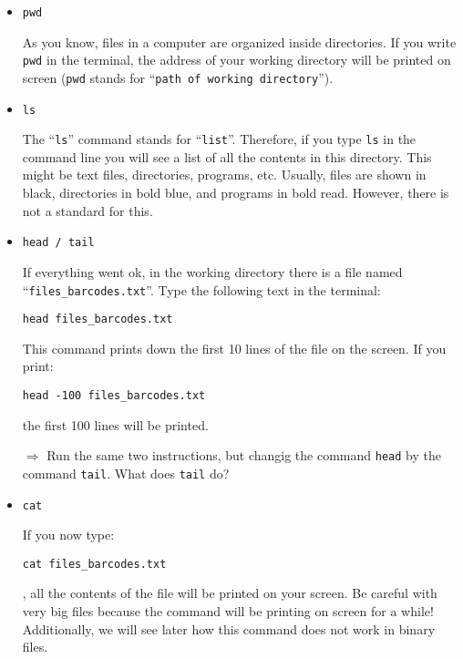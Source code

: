 \documentclass[11pt]{article}
\begin{document}
\begin{itemize}
\item \texttt{pwd}

As you know, files in a computer are organized inside directories. If you write \texttt{pwd} in the terminal, the address of your working directory will be printed on screen (\texttt{pwd} stands for ``\texttt{path of working directory}'').

\item \texttt{ls}

The ``\texttt{ls}'' command stands for ``\texttt{list}''. Therefore, if you type \texttt{ls} in the command line you will see a list of all the contents in this directory. This might be text files, directories, programs, etc. Usually, files are shown in black, directories in bold blue, and programs in bold read. However, there is not a standard for this. 

\item \texttt{head / tail}

If everything went ok, in the working directory there is a file named ``\texttt{files\_barcodes.txt}''. Type the following text in the terminal: 

\begin{verbatim}
head files_barcodes.txt
\end{verbatim}

This command prints down the first 10 lines of the file on the screen. If you print:

\begin{verbatim}
head -100 files_barcodes.txt
\end{verbatim}

the first 100 lines will be printed. 

\vspace{1em}
\hrulefill

$\Rightarrow$ Run the same two instructions, but changig the command  \texttt{head} by the command \texttt{tail}. What does \texttt{tail} do?

\hrulefill
\vspace{1em}


\item \texttt{cat}

If you now type:

\begin{verbatim}
cat files_barcodes.txt
\end{verbatim}
, all the contents of the file will be printed on your screen. Be careful with very big files because the command will be printing on screen for a while! Additionally, we will see later how this command does not work in binary files. 


\end{itemize}
\end{document}

